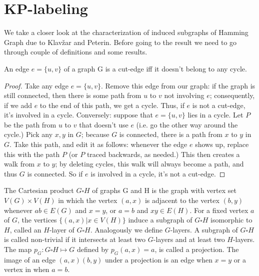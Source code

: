 \documentclass[12pt,a4paper,titlepage,openany]{report}
\begin{document}
\section{KP-labeling}\label{kp-labeling-section}
We take a closer look at the characterization of induced subgraphs of Hamming Graph due to Klav\v zar and Peterin. \newline
Before going to the result we need to go through couple of definitions and some results.
\newline
\begin{corollary}
An edge $e = \{u, v\}$ of a graph G is a cut-edge iff it doesn’t belong to any cycle.
\end{corollary}
\begin{proof} Take any edge $e = \{u, v\}$. Remove this edge from our graph: if the graph is still connected, then there is some path from $u$ to $v$ not involving $e$;
consequently, if we add $e$ to the end of this path, we get a cycle. Thus, if $e$ is not a cut-edge, it’s involved in a cycle.\newline
Conversely: suppose that $e = \{u, v\}$ lies in a cycle.
Let $P$ be the path from $u$ to $v$ that doesn’t use $e$ (i.e. go the other way around the cycle.) Pick any $x, y$ in $G$; because $G$ is connected, there is a path from $x$ to $y$ in $G$. Take this path, and edit it as follows:
whenever the edge $e$ shows up, replace this with the path $P$ (or $P$ traced backwards, as needed.) This then creates a walk from $x$ to $y$; by deleting cycles, this walk will always become a path, and thus $G$ is connected. So if $e$ is involved in a cycle, it’s not a cut-edge.
\end{proof}
The Cartesian product $G\square H$ of graphs G and H is the graph with vertex set $V(G)\times V(H)$ in which the vertex $(a,x)$ is adjacent to the vertex $(b,y)$ whenever
$ab\in E(G)$ and $x=y$, or $a=b$ and $xy\in E(H)$. For a fixed vertex $a$ of $G$, the vertices $\{(a,x)|x\in V(H)\}$ induce a subgraph of $G \square H$ isomorphic to $H$, called an $H$-layer of $G \square H$. Analogously we define $G$-layers. A subgraph of $G \square H$ is called non-trivial if it intersects at least two $G$-layers and at least two $H$-layers. \newline
The map $p_G:G\square H \mapsto G$ defined by $p_G(a,x)=a$, is called a projection. The image of an edge $(a,x)(b,y)$ under a projection is an edge when $x=y$ or a vertex in when $a=b$.\newline
\end{document}
